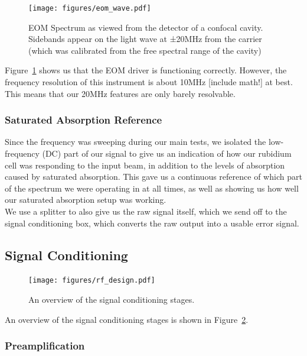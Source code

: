 \begin{figure}
  \centering\texttt{[image: figures/eom\_wave.pdf]}
  \caption{EOM Spectrum as viewed from the detector of a confocal cavity.  Sidebands appear on the light wave at ±20MHz from the carrier (which was calibrated from the free spectral range of the cavity)}
  \label{fig:eom_wave}
\end{figure}

Figure~\ref{fig:eom_wave} shows us that the EOM driver is functioning correctly.  However, the frequency resolution of this instrument is about 10MHz [include math!] at best.  This means that our 20MHz features are only barely resolvable. \\
    
    \subsubsection{Saturated Absorption Reference}
    
Since the frequency was sweeping during our main tests, we isolated the low-frequency (DC) part of our signal to give us an indication of how our rubidium cell was responding to the input beam, in addition to the levels of absorption caused by saturated absorption.  This gave us a continuous reference of which part of the spectrum we were operating in at all times, as well as showing us how well our saturated absorption setup was working. \\

We use a splitter to also give us the raw signal itself, which we send off to the signal conditioning box, which converts the raw output into a usable error signal. \\

\subsection{Signal Conditioning}
\label{sec:signalcond}

\begin{figure}
  \centering\texttt{[image: figures/rf\_design.pdf]}
  \caption{An overview of the signal conditioning stages.}
  \label{rf_design}
\end{figure}

An overview of the signal conditioning stages is shown in Figure~\ref{rf_design}. \\

    \subsubsection{Preamplification}

